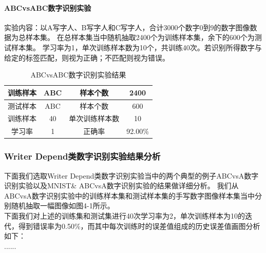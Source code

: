 \paragraph{ABCvsABC数字识别实验}
\hspace*{\parindent}实验内容：以A写字人、B写字人和C写字人，合计3000个数字0到9的数字图像数据为总样本集。
在总样本集当中随机抽取2400个为训练样本集，余下的600个为测试样本集。
学习率为1，单次训练样本数为10个，共训练40次。若识别所得数字与给定的标签匹配，则视为正确；不匹配则视为错误。
\begin{table}[!htbp]
    \centering
    \caption{ABCvsABC数字识别实验结果}
    \begin{tabular}[\textwidth]{c|c|c|c}
        \hline
        训练样本 & ABC & 样本个数 & 2400 \\
        \hline
        测试样本 & ABC & 样本个数 & 600 \\
        \hline
        训练样本 & 40 & 单次训练样本数 & 10 \\
        \hline
        学习率 & 1 & 正确率 & 92.00\% \\
        \hline
    \end{tabular}
\end{table}

\subsubsection{Writer Depend类数字识别实验结果分析}
下面我们选取Writer Depend类数字识别实验当中的两个典型的例子ABCvsA数字识别实验以及MNIST\& ABCvsA数字识别实验的结果做详细分析。
我们从ABCvsA数字识别实验中的训练样本集和测试样本集的手写数字图像样本集当中分别随机抽取一幅图像如图4-1所示。\\
\hspace*{\parindent}下面我们对上述的训练集和测试集进行40次学习率为2，单次训练样本为10的迭代，得到错误率为0.50\%，而其中每次训练时的误差值组成的历史误差值画图分析如下：\\
\hspace*{\parindent}......

